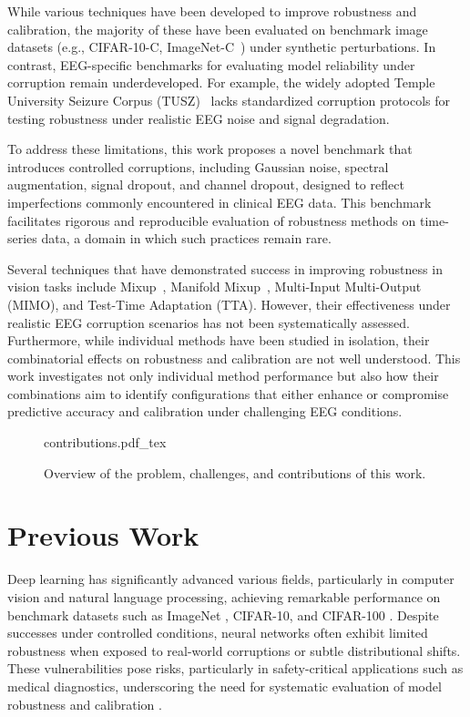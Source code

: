 While various techniques have been developed to improve robustness and calibration, the majority of these have been evaluated on benchmark image datasets (e.g., CIFAR-10-C, ImageNet-C~\cite{hendrycks2019benchmarking}) under synthetic perturbations. In contrast, EEG-specific benchmarks for evaluating model reliability under corruption remain underdeveloped. For example, the widely adopted Temple University Seizure Corpus (TUSZ)~\cite{obeid2016temple} lacks standardized corruption protocols for testing robustness under realistic EEG noise and signal degradation.

To address these limitations, this work proposes a novel benchmark that introduces controlled corruptions, including Gaussian noise, spectral augmentation, signal dropout, and channel dropout, designed to reflect imperfections commonly encountered in clinical EEG data. This benchmark facilitates rigorous and reproducible evaluation of robustness methods on time-series data, a domain in which such practices remain rare.

Several techniques that have demonstrated success in improving robustness in vision tasks include Mixup~\cite{thulasidasan2019mixup}, Manifold Mixup~\cite{manifoldmixup}, Multi-Input Multi-Output (MIMO)\cite{MIMO}, and Test-Time Adaptation (TTA)\cite{tta}. However, their effectiveness under realistic EEG corruption scenarios has not been systematically assessed. Furthermore, while individual methods have been studied in isolation, their combinatorial effects on robustness and calibration are not well understood. This work investigates not only individual method performance but also how their combinations aim to identify configurations that either enhance or compromise predictive accuracy and calibration under challenging EEG conditions.
\begin{figure}[htb]
	\centering
        \def\svgwidth{300pt}
 	{contributions.pdf_tex} 	  	 	
	\caption[Overview of the challenges and contributions of this work]{Overview of the problem, challenges, and contributions of this work.}
	\label{fig:overview}
\end{figure}

\section{Previous Work}
Deep learning has significantly advanced various fields, particularly in computer vision and natural language processing, achieving remarkable performance on benchmark datasets such as ImageNet \cite{deng2009imagenet}, CIFAR-10, and CIFAR-100 \cite{krizhevsky2009learning}. Despite successes under controlled conditions, neural networks often exhibit limited robustness when exposed to real-world corruptions or subtle distributional shifts. These vulnerabilities pose risks, particularly in safety-critical applications such as medical diagnostics, underscoring the need for systematic evaluation of model robustness and calibration \cite{hendrycks2019benchmarking}.

